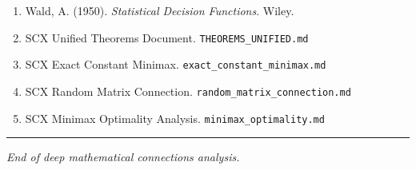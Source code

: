 \documentclass[
  12pt,
]{article}
\begin{document}
\begin{enumerate}
  Neyman, J., \& Pearson, E. S. (1933). On the problem of the most
  efficient tests of statistical hypotheses. \emph{Philosophical
  Transactions of the Royal Society A}, 231, 289-337.
\item
  Wald, A. (1950). \emph{Statistical Decision Functions}. Wiley.
\item
  SCX Unified Theorems Document. \texttt{THEOREMS\_UNIFIED.md}
\item
  SCX Exact Constant Minimax. \texttt{exact\_constant\_minimax.md}
\item
  SCX Random Matrix Connection. \texttt{random\_matrix\_connection.md}
\item
  SCX Minimax Optimality Analysis. \texttt{minimax\_optimality.md}
\end{enumerate}

\begin{center}\rule{0.5\linewidth}{0.5pt}\end{center}

\emph{End of deep mathematical connections analysis.}
\end{document}
